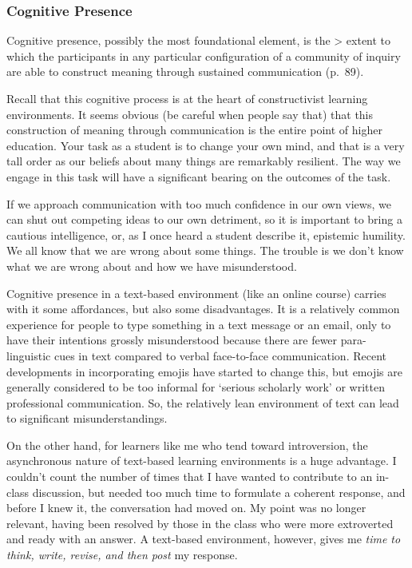\documentclass[
]{book}
\begin{document}
\hypertarget{cognitive-presence}{%
\subsubsection*{Cognitive Presence}\label{cognitive-presence}}

Cognitive presence, possibly the most foundational element, is the
\textgreater{} extent to which the participants in any particular configuration of a community of inquiry are able to construct meaning through sustained communication (p.~89).

Recall that this cognitive process is at the heart of constructivist learning environments. It seems obvious (be careful when people say that) that this construction of meaning through communication is the entire point of higher education. Your task as a student is to change your own mind, and that is a very tall order as our beliefs about many things are remarkably resilient. The way we engage in this task will have a significant bearing on the outcomes of the task.

If we approach communication with too much confidence in our own views, we can shut out competing ideas to our own detriment, so it is important to bring a cautious intelligence, or, as I once heard a student describe it, epistemic humility. We all know that we are wrong about some things. The trouble is we don't know what we are wrong about and how we have misunderstood.

Cognitive presence in a text-based environment (like an online course) carries with it some affordances, but also some disadvantages. It is a relatively common experience for people to type something in a text message or an email, only to have their intentions grossly misunderstood because there are fewer para-linguistic cues in text compared to verbal face-to-face communication. Recent developments in incorporating emojis have started to change this, but emojis are generally considered to be too informal for `serious scholarly work' or written professional communication. So, the relatively lean environment of text can lead to significant misunderstandings.

On the other hand, for learners like me who tend toward introversion, the asynchronous nature of text-based learning environments is a huge advantage. I couldn't count the number of times that I have wanted to contribute to an in-class discussion, but needed too much time to formulate a coherent response, and before I knew it, the conversation had moved on. My point was no longer relevant, having been resolved by those in the class who were more extroverted and ready with an answer. A text-based environment, however, gives me \emph{time to think, write, revise, and then post} my response.
\end{document}
